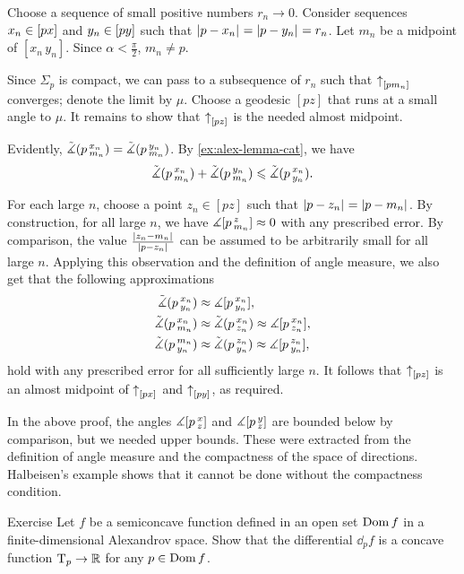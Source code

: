 Choose a sequence of small positive numbers $r_n\to0$.
Consider sequences $x_n\z\in [px]$ and $y_n\z\in [py]$ such that $\dist{p}{x_n}{}=\dist{p}{y_n}{}=r_n$.
Let $m_n$ be a midpoint of $[x_n\,y_n]$.
Since $\alpha<\tfrac\pi2$, $m_n\ne p$.

Since $\Sigma_p$ is compact, we can pass to a subsequence of $r_n$ such that
${\uparrow}_{[{p}{m_n}]_{{}}}$ converges;
denote the limit by $\mu$.
Choose a geodesic $[pz]$ that runs at a small angle to $\mu$.
It remains to show that ${\uparrow}_{[{p}{z}]_{{}}}$ is the needed almost midpoint.

Evidently, $\tilde\measuredangle(p\,{}^{x_n}_{m_n})=\tilde\measuredangle(p\,{}^{y_n}_{m_n})$.
By \ref{ex:alex-lemma-cat}, we have
\[\tilde\measuredangle(p\,{}^{x_n}_{m_n})+\tilde\measuredangle(p\,{}^{y_n}_{m_n})\leqslant \tilde\measuredangle(p\,{}^{x_n}_{y_n}).\]

For each large $n$, choose a point $z_n\in [pz]$ such that $\dist{p}{z_n}{}=\dist{p}{m_n}{}$.
By construction, for all large $n$, we have $\measuredangle[p\,{}^{z}_{m_n}]\approx0$ with any prescribed error.
By comparison, the value $\frac{\dist{z_n}{m_n}{}}{\dist{p}{z_n}{}}$ can be assumed to be arbitrarily small for all large $n$.
Applying this observation and the definition of angle measure, we also get that the following approximations
\begin{align*}
\tilde\measuredangle(p\,{}^{x_n}_{y_n})&\approx \measuredangle[p\,{}^{x_n}_{y_n}],
\\
\tilde\measuredangle(p\,{}^{x_n}_{m_n})&\approx\tilde\measuredangle(p\,{}^{x_n}_{z_n})\approx\measuredangle[p\,{}^{x_n}_{z_n}],
\\
\tilde\measuredangle(p\,{}^{m_n}_{y_n})&\approx\tilde\measuredangle(p\,{}^{z_n}_{y_n})\approx\measuredangle[p\,{}^{z_n}_{y_n}],
\end{align*}
hold with any prescribed error for all sufficiently large $n$.
It follows that ${\uparrow}_{[{p}{z}]_{{}}}$ is an almost midpoint of ${\uparrow}_{[{p}{x}]_{{}}}$ and ${\uparrow}_{[{p}{y}]_{{}}}$, as required.
\qeds

In the above proof, the angles $\measuredangle[p\,{}^{x}_{z}]$ and $\measuredangle[p\,{}^{y}_{z}]$ are bounded below by
comparison, but we needed upper bounds.
These were extracted from the definition of angle measure and the compactness of the space of directions.
Halbeisen's example \cite[13.6]{alexander-kapovitch-petrunin2024} shows that it cannot be done without the compactness condition.

\begin{thm}[!]{Exercise}\label{ex:concave-differential}
Let $f$ be a semiconcave function defined in an open set $\mathop{\rm Dom}\nolimits f$ in a finite-dimensional Alexandrov space.
Show that the differential $\dd_pf$ is a concave function $\mathrm{T}_p\to\mathbb{R}$ for any $p\in \mathop{\rm Dom}\nolimits f$.
\end{thm}


